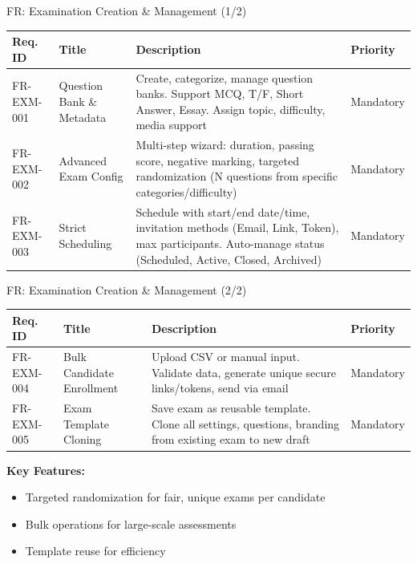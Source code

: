 \begin{frame}{FR: Examination Creation \& Management (1/2)}
    \begin{table}[]
        \centering
        \tiny
        \begin{tabular}{|l|p{3cm}|p{5.5cm}|l|}
            \hline
            \textbf{Req. ID} & \textbf{Title} & \textbf{Description} & \textbf{Priority} \\
            \hline
            FR-EXM-001 & Question Bank \& Metadata & Create, categorize, manage question banks. Support MCQ, T/F, Short Answer, Essay. Assign topic, difficulty, media support & Mandatory \\
            \hline
            FR-EXM-002 & Advanced Exam Config & Multi-step wizard: duration, passing score, negative marking, targeted randomization (N questions from specific categories/difficulty) & Mandatory \\
            \hline
            FR-EXM-003 & Strict Scheduling & Schedule with start/end date/time, invitation methods (Email, Link, Token), max participants. Auto-manage status (Scheduled, Active, Closed, Archived) & Mandatory \\
            \hline
        \end{tabular}
    \end{table}
\end{frame}

\begin{frame}{FR: Examination Creation \& Management (2/2)}
    \begin{table}[]
        \centering
        \tiny
        \begin{tabular}{|l|p{3cm}|p{5.5cm}|l|}
            \hline
            \textbf{Req. ID} & \textbf{Title} & \textbf{Description} & \textbf{Priority} \\
            \hline
            FR-EXM-004 & Bulk Candidate Enrollment & Upload CSV or manual input. Validate data, generate unique secure links/tokens, send via email & Mandatory \\
            \hline
            FR-EXM-005 & Exam Template Cloning & Save exam as reusable template. Clone all settings, questions, branding from existing exam to new draft & Mandatory \\
            \hline
        \end{tabular}
    \end{table}
    
    \vspace{0.3cm}
    \textbf{Key Features:}
    \begin{itemize}
        \item Targeted randomization for fair, unique exams per candidate
        \item Bulk operations for large-scale assessments
        \item Template reuse for efficiency
    \end{itemize}
\end{frame}

